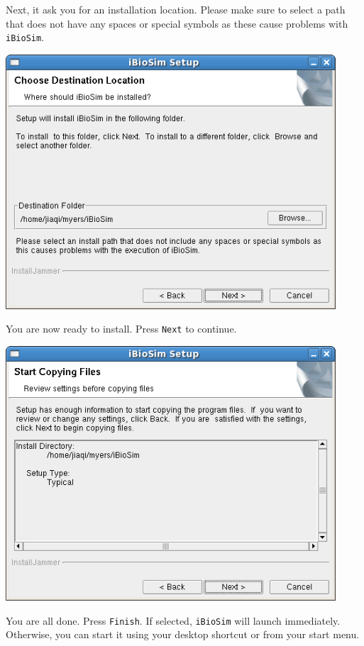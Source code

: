 \documentclass[titlepage,11pt]{article}
\begin{document}
Next, it ask you for an installation location.  Please make sure to
select a path that does not have any spaces or special symbols as
these cause problems with {\tt iBioSim}.

\includegraphics[height=95mm]{screenshots/location}

\clearpage

You are now ready to install.  Press {\tt Next} to continue.

\includegraphics[height=95mm]{screenshots/confirm}

You are all done.  Press {\tt Finish}.  If selected, {\tt iBioSim}
will launch immediately.  Otherwise, you can start it using your
desktop shortcut or from your start menu.
\end{document}
